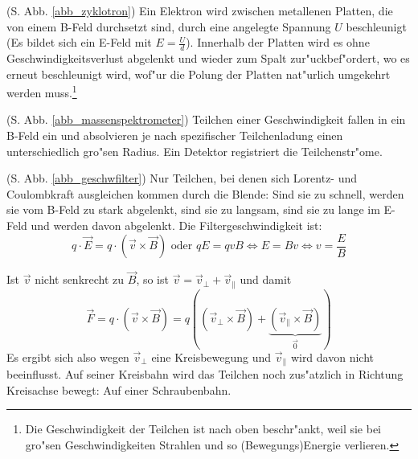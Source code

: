 \begin{Beispiel}
\begin{description}[\setlabelstyle{\bfseries\slshape}]
\item[\index{Zyklotron}Zyklotron] (S. Abb. \ref{abb_zyklotron}) Ein
   Elektron wird zwischen metallenen Platten, die von einem B-Feld
   durchsetzt sind, durch eine angelegte Spannung $U$ beschleunigt (Es
   bildet sich ein E-Feld mit $E = \frac{U}{d}$). Innerhalb der
   Platten wird es ohne Geschwindigkeitsverlust abgelenkt und wieder
   zum Spalt zur"uckbef"ordert, wo es erneut beschleunigt
   wird, wof"ur die Polung der Platten nat"urlich umgekehrt werden muss.\footnote{Die Geschwindigkeit der Teilchen ist nach oben
     beschr"ankt, weil sie bei gro"sen Geschwindigkeiten Strahlen und so
     (Bewegungs)Energie verlieren.}
\item[\index{Massenspektrometer}Massenspektrometer] (S. Abb. \ref{abb_massenspektrometer})
   Teilchen einer Geschwindigkeit fallen in ein B-Feld ein und
   absolvieren je nach spezifischer Teilchenladung einen
   unterschiedlich gro"sen Radius. Ein Detektor registriert die
   Teilchenstr"ome.
\item[\index{Geschwindigkeitsfilter}Geschwindigkeitsfilter] (S. Abb. \ref{abb_geschwfilter}) Nur
   Teilchen, bei denen sich Lorentz- und Coulombkraft ausgleichen
   kommen durch die Blende: Sind sie zu schnell, werden sie vom B-Feld
   zu stark abgelenkt, sind sie zu langsam, sind sie zu lange im
   E-Feld und werden davon abgelenkt. Die Filtergeschwindigkeit ist:
   \begin{equation*}
      \label{eq:327}
      q \cdot \vec E = q \cdot (\vec v \times \vec B) \text{ oder } q
      E = q v B \Leftrightarrow E = Bv \Leftrightarrow v = \frac{E}{B}
   \end{equation*}
\item[\index{Schraubenbahn}Schraubenbahn] Ist $\vec v$ nicht senkrecht
   zu $\vec B$, so ist $\vec v = \vec v_\bot + \vec v_\|$ und damit
   \begin{equation}
      \label{eq:328}
      \vec F = q \cdot (\vec v \times \vec B)
= q \left ( (\vec
         v_\bot \times \vec B ) +  \underbrace{( \vec v_\| \times \vec
         B )}_{\vec 0}\right )
   \end{equation}
   Es ergibt sich also wegen $\vec v_\bot$ eine Kreisbewegung und
   $\vec v_\|$ wird davon nicht beeinflusst. Auf seiner Kreisbahn wird
   das Teilchen noch zus"atzlich in Richtung Kreisachse bewegt: Auf
   einer Schraubenbahn.
\item[\index{Teilchenfalle}Teilchenfalle]

\end{description}
\end{Beispiel}
